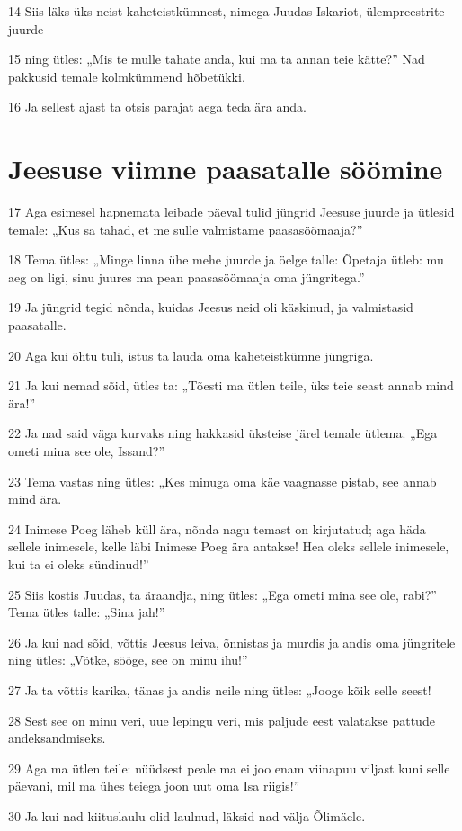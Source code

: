 \par 14 Siis läks üks neist kaheteistkümnest, nimega Juudas Iskariot, ülempreestrite juurde
\par 15 ning ütles: „Mis te mulle tahate anda, kui ma ta annan teie kätte?” Nad pakkusid temale kolmkümmend hõbetükki.
\par 16 Ja sellest ajast ta otsis parajat aega teda ära anda.

\section*{Jeesuse viimne paasatalle söömine}

\par 17 Aga esimesel hapnemata leibade päeval tulid jüngrid Jeesuse juurde ja ütlesid temale: „Kus sa tahad, et me sulle valmistame paasasöömaaja?”
\par 18 Tema ütles: „Minge linna ühe mehe juurde ja öelge talle: Õpetaja ütleb: mu aeg on ligi, sinu juures ma pean paasasöömaaja oma jüngritega.”
\par 19 Ja jüngrid tegid nõnda, kuidas Jeesus neid oli käskinud, ja valmistasid paasatalle.
\par 20 Aga kui õhtu tuli, istus ta lauda oma kaheteistkümne jüngriga.
\par 21 Ja kui nemad sõid, ütles ta: „Tõesti ma ütlen teile, üks teie seast annab mind ära!”
\par 22 Ja nad said väga kurvaks ning hakkasid üksteise järel temale ütlema: „Ega ometi mina see ole, Issand?”
\par 23 Tema vastas ning ütles: „Kes minuga oma käe vaagnasse pistab, see annab mind ära.
\par 24 Inimese Poeg läheb küll ära, nõnda nagu temast on kirjutatud; aga häda sellele inimesele, kelle läbi Inimese Poeg ära antakse! Hea oleks sellele inimesele, kui ta ei oleks sündinud!”
\par 25 Siis kostis Juudas, ta äraandja, ning ütles: „Ega ometi mina see ole, rabi?” Tema ütles talle: „Sina jah!”
\par 26 Ja kui nad sõid, võttis Jeesus leiva, õnnistas ja murdis ja andis oma jüngritele ning ütles: „Võtke, sööge, see on minu ihu!”
\par 27 Ja ta võttis karika, tänas ja andis neile ning ütles: „Jooge kõik selle seest!
\par 28 Sest see on minu veri, uue lepingu veri, mis paljude eest valatakse pattude andeksandmiseks.
\par 29 Aga ma ütlen teile: nüüdsest peale ma ei joo enam viinapuu viljast kuni selle päevani, mil ma ühes teiega joon uut oma Isa riigis!”
\par 30 Ja kui nad kiituslaulu olid laulnud, läksid nad välja Õlimäele.

